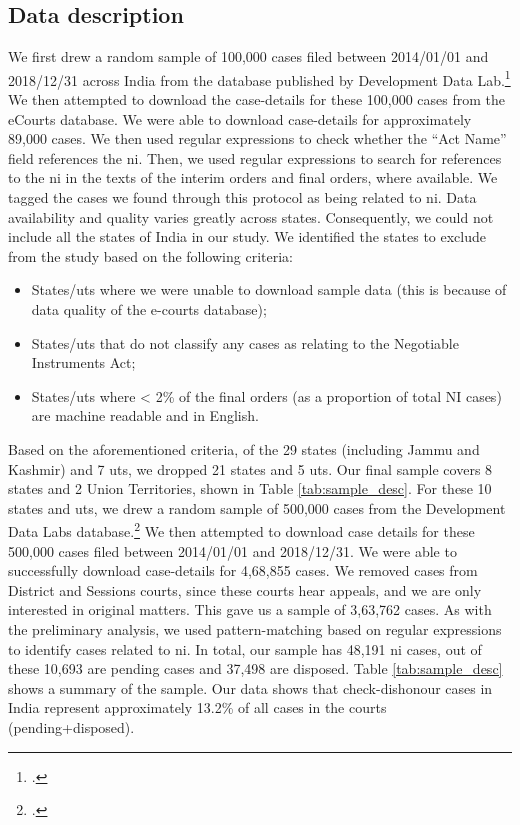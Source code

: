 \subsection{Data description}
\label{sec:data-description}
We first drew a random sample of 100,000 cases filed between 2014/01/01 and 2018/12/31 across India from the database published by Development Data Lab.\footcite{devdatalabs2021_eCourtsData} We then attempted to download the case-details for these 100,000 cases from the eCourts database. We were able to download case-details for approximately 89,000 cases. We then used regular expressions to check whether the ``Act Name'' field references the \gls{ni}. Then, we used regular expressions to search for references to the \gls{ni} in the texts of the interim orders and final orders, where available. We tagged the cases we found through this protocol as being related to \gls{ni}. Data availability and quality varies greatly across states. Consequently, we could not include all the states of India in our study. We identified the states to exclude from the study based on the following criteria:
\begin{itemize}
\item States/\glspl{ut} where we were unable to download sample data (this is because of data quality of the e-courts database);
\item States/\glspl{ut} that do not classify any cases as relating to the Negotiable Instruments Act;
\item States/\glspl{ut} where < 2\% of the final orders (as a proportion of total NI cases) are machine readable and in English.
\end{itemize}

Based on the aforementioned criteria, of the 29 states (including Jammu and Kashmir) and 7 \glspl{ut}, we dropped 21 states and 5 \glspl{ut}. Our final sample covers 8 states and 2 Union Territories, shown in Table \ref{tab:sample_desc}. For these 10 states and \glspl{ut}, we drew a random sample of 500,000 cases from the Development Data Labs database.\footcite{devdatalabs2021_eCourtsData} We then attempted to download case details for these 500,000 cases filed between 2014/01/01 and 2018/12/31. We were able to successfully download case-details for 4,68,855 cases. We removed cases from District and Sessions courts, since these courts hear appeals, and we are only interested in original matters. This gave us a sample of 3,63,762 cases. As with the preliminary analysis, we used pattern-matching based on regular expressions to identify cases related to \gls{ni}. In total, our sample has 48,191 \gls{ni} cases, out of these 10,693 are pending cases and 37,498 are disposed. Table \ref{tab:sample_desc} shows a summary of the sample. Our data shows that check-dishonour cases in India represent approximately 13.2\% of all cases in the courts (pending+disposed).

